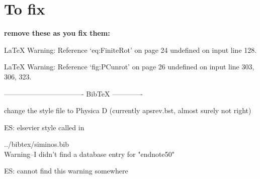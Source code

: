 
\section*{To fix}

{\bf remove these as you fix them:}


LaTeX Warning: Reference `eq:FiniteRot' on page 24 undefined on input line 128.


LaTeX Warning: Reference `fig:PCunrot' on page 26 undefined on input line 303, 306, 323.


---------------------------------- BibTeX -------------


change the style file to Physica D (currently apsrev.bst,
almost surely not right)

ES: elsevier style called in %

../bibtex/siminos.bib
\\
Warning--I didn't find a database entry for "endnote50"

ES: cannot find this warning somewhere

